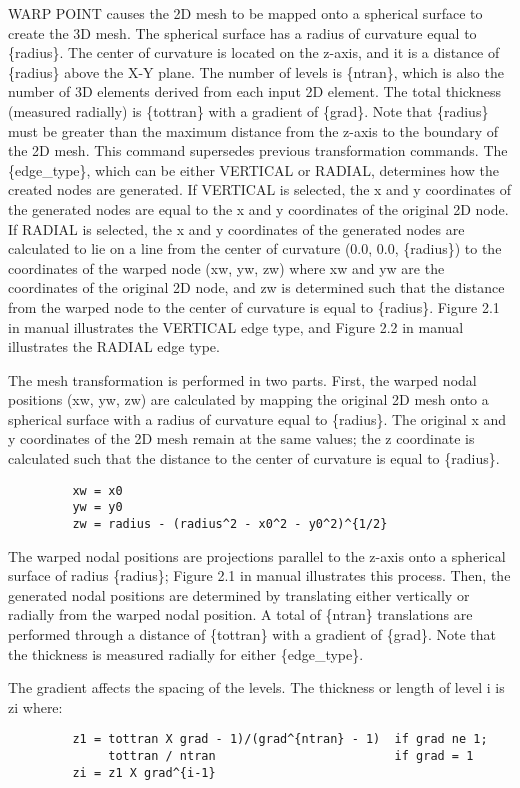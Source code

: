 WARP POINT causes the 2D mesh to be mapped onto a spherical surface to
create the 3D mesh.  The spherical surface has a radius of curvature
equal to \{radius\}.  The center of curvature is located on the z-axis,
and it is a distance of \{radius\} above the X-Y plane.  The number of
levels is \{ntran\}, which is also the number of 3D elements derived from
each input 2D element.  The total thickness (measured radially) is
\{tottran\} with a gradient of \{grad\}.  Note that \{radius\} must be greater
than the maximum distance from the z-axis to the boundary of the 2D
mesh.  This command supersedes previous transformation commands.
The \{edge\_type\}, which can be either VERTICAL or RADIAL, determines how
the created nodes are generated.  If VERTICAL is selected, the x and y
coordinates of the generated nodes are equal to the x and y coordinates
of the original 2D node.  If RADIAL is selected, the x and y coordinates
of the generated nodes are calculated to lie on a line from the center
of curvature (0.0, 0.0, \{radius\}) to the coordinates of the warped node
(xw, yw, zw) where xw and yw are the coordinates of the original 2D
node, and zw is determined such that the distance from the warped node
to the center of curvature is equal to \{radius\}.  Figure 2.1 in manual
illustrates the VERTICAL edge type, and Figure 2.2 in manual illustrates
the RADIAL edge type.

The mesh transformation is performed in two parts.  First, the warped
nodal positions (xw, yw, zw) are calculated by mapping the original 2D
mesh onto a spherical surface with a radius of curvature equal to
\{radius\}.  The original x and y coordinates of the 2D mesh remain at the
same values; the z coordinate is calculated such that the distance to
the center of curvature is equal to \{radius\}.
\begin{verbatim}
         xw = x0
         yw = y0
         zw = radius - (radius^2 - x0^2 - y0^2)^{1/2}
\end{verbatim}
The warped nodal positions are projections parallel to the z-axis onto a
spherical surface of radius \{radius\}; Figure 2.1 in manual illustrates
this process. Then, the generated nodal positions are determined by
translating either vertically or radially from the warped nodal
position.  A total of \{ntran\} translations are performed through a
distance of \{tottran\} with a gradient of \{grad\}.  Note that the
thickness is measured radially for either \{edge\_type\}.

The gradient affects the spacing of the levels.  The thickness or length
of level i is zi where:
\begin{verbatim}
         z1 = tottran X grad - 1)/(grad^{ntran} - 1)  if grad ne 1;
              tottran / ntran                         if grad = 1
         zi = z1 X grad^{i-1}
\end{verbatim}

